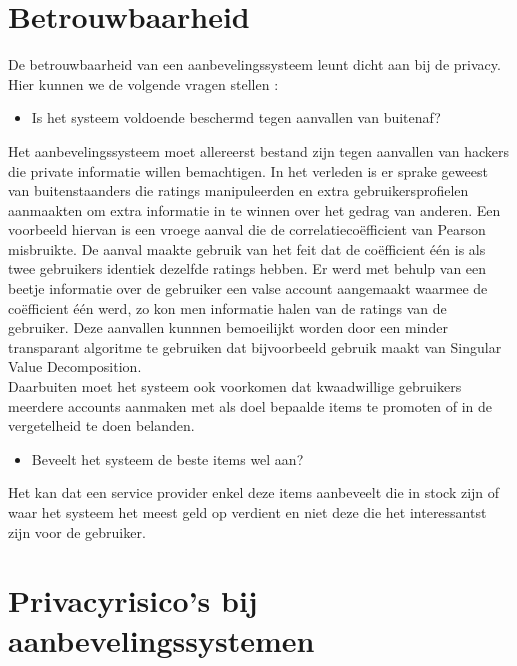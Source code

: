 \section{Betrouwbaarheid}
De betrouwbaarheid van een aanbevelingssysteem leunt dicht aan bij de privacy. Hier kunnen we de volgende vragen stellen : 

\begin{itemize}
 
\item Is het systeem voldoende beschermd tegen aanvallen van buitenaf?
\end{itemize}
 Het aanbevelingssysteem moet allereerst bestand zijn tegen aanvallen van hackers die private informatie willen bemachtigen. In het verleden is er sprake geweest van buitenstaanders die ratings manipuleerden en extra gebruikersprofielen aanmaakten om extra informatie in te winnen over het gedrag van anderen. Een voorbeeld hiervan is een vroege aanval die de correlatieco\"efficient van Pearson misbruikte. De aanval maakte gebruik van het feit dat de co\"efficient \'e\'en is als twee gebruikers identiek dezelfde ratings hebben. Er werd met behulp van een beetje informatie over de gebruiker een valse account aangemaakt waarmee de co\"efficient \'e\'en werd, zo kon men informatie halen van de ratings van de gebruiker.  Deze aanvallen kunnnen bemoeilijkt worden door een minder transparant algoritme te gebruiken dat bijvoorbeeld gebruik maakt van Singular Value Decomposition. \\Daarbuiten moet het systeem ook voorkomen dat kwaadwillige gebruikers meerdere accounts aanmaken met als doel bepaalde items te promoten of in de vergetelheid te doen belanden. 
 
 \begin{itemize}
\item Beveelt het systeem de beste items wel aan?
\end{itemize}
 
  Het kan dat een service provider enkel deze items aanbeveelt die in stock zijn of waar het systeem het meest geld op verdient en niet deze die het interessantst zijn voor de gebruiker. 

\section{Privacyrisico's bij aanbevelingssystemen}
\label{sec:risicos}

